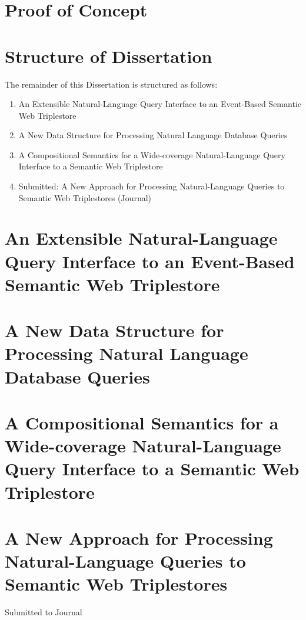 \documentclass[../main.tex]{subfiles}
\begin{document}
\section{Proof of Concept} 

\section{Structure of Dissertation}

The remainder of this Dissertation is structured as follows:

\begin{enumerate}
	\item An Extensible Natural-Language Query Interface to an Event-Based Semantic Web Triplestore
	\item A New Data Structure for Processing Natural Language Database Queries 
	\item A Compositional Semantics for a Wide-coverage Natural-Language Query Interface to a Semantic Web Triplestore
	\item Submitted: A New Approach for Processing Natural-Language Queries to Semantic Web Triplestores (Journal)
\end{enumerate}

\section{An Extensible Natural-Language Query Interface to an Event-Based Semantic Web Triplestore}

\section{A New Data Structure for Processing Natural Language Database Queries}

\section{A Compositional Semantics for a Wide-coverage Natural-Language Query Interface to a Semantic Web Triplestore}

\section{A New Approach for Processing Natural-Language Queries to Semantic Web Triplestores}

Submitted to Journal
\end{document}
